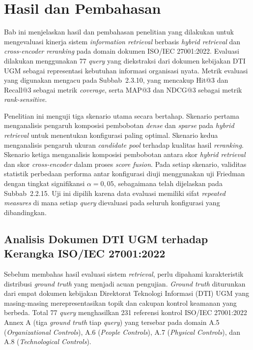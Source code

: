 \chapter{Hasil dan Pembahasan}
\setcounter{secnumdepth}{3}

Bab ini menjelaskan hasil dan pembahasan penelitian yang dilakukan untuk mengevaluasi kinerja sistem \textit{information retrieval} berbasis \textit{hybrid retrieval} dan \textit{cross-encoder reranking} pada domain dokumen ISO/IEC 27001:2022. Evaluasi dilakukan menggunakan 77 \textit{query} yang diekstraksi dari dokumen kebijakan DTI UGM sebagai representasi kebutuhan informasi organisasi nyata. Metrik evaluasi yang digunakan mengacu pada Subbab~2.3.10, yang mencakup Hit@3 dan Recall@3 sebagai metrik \textit{coverage}, serta MAP@3 dan NDCG@3 sebagai metrik \textit{rank-sensitive}.

Penelitian ini menguji tiga skenario utama secara bertahap. Skenario pertama menganalisis pengaruh komposisi pembobotan \textit{dense} dan \textit{sparse} pada \textit{hybrid retrieval} untuk menentukan konfigurasi paling optimal. Skenario kedua menganalisis pengaruh ukuran \textit{candidate pool} terhadap kualitas hasil \textit{reranking}. Skenario ketiga menganalisis komposisi pembobotan antara skor \textit{hybrid retrieval} dan skor \textit{cross-encoder} dalam proses \textit{score fusion}. Pada setiap skenario, validitas statistik perbedaan performa antar konfigurasi diuji menggunakan uji Friedman \cite{pereira2015overview} dengan tingkat signifikansi $\alpha = 0{,}05$, sebagaimana telah dijelaskan pada Subbab~2.2.15. Uji ini dipilih karena data evaluasi memiliki sifat \textit{repeated measures} di mana setiap \textit{query} dievaluasi pada seluruh konfigurasi yang dibandingkan.


\section{Analisis Dokumen DTI UGM terhadap Kerangka ISO/IEC 27001:2022}

Sebelum membahas hasil evaluasi sistem \textit{retrieval}, perlu dipahami karakteristik distribusi \textit{ground truth} yang menjadi acuan pengujian. \textit{Ground truth} diturunkan dari empat dokumen kebijakan Direktorat Teknologi Informasi (DTI) UGM yang masing-masing merepresentasikan topik dan cakupan kontrol keamanan yang berbeda. Total 77 \textit{query} menghasilkan 231 referensi kontrol ISO/IEC 27001:2022 Annex A (tiga \textit{ground truth} tiap \textit{query}) yang tersebar pada domain A.5 (\textit{Organizational Controls}), A.6 (\textit{People Controls}), A.7 (\textit{Physical Controls}), dan A.8 (\textit{Technological Controls}).


